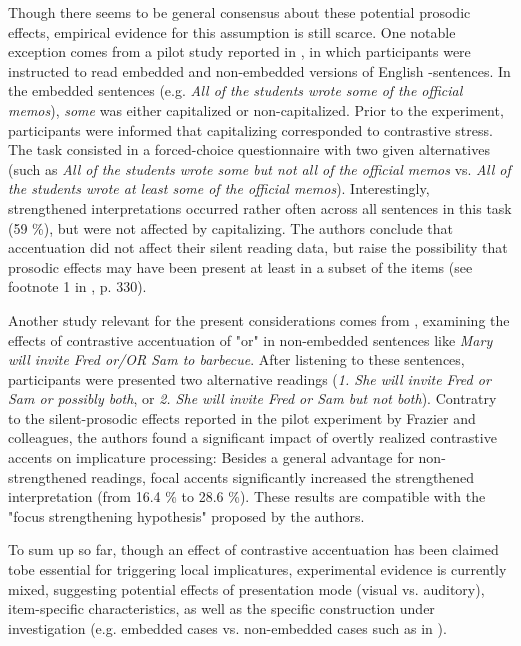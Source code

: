 \documentclass[fleqn,reqno,10pt,draft]{article}
\newcommand{\as}{\acro{as}}
\begin{document}
Though there seems to be general consensus about these potential 
prosodic effects, empirical evidence for this assumption 
is still scarce. One notable exception comes from a pilot study 
reported in \citet{Frazier08}, in which participants were 
instructed to read embedded and non-embedded versions of English 
\as-sentences. In the embedded sentences (e.g. {\it All of the students 
wrote some of the official memos}), {\it some} was either capitalized 
or non-capitalized. Prior to the experiment, 
participants were informed that capitalizing corresponded to contrastive 
stress. The task consisted in a forced-choice questionnaire with two
given alternatives (such as {\it All of the students wrote some but 
not all of the official memos}  vs. {\it All of the students wrote at 
least some of the official memos}). Interestingly, strengthened  
interpretations occurred rather often across all sentences in this task 
(59 \%), but were not affected by capitalizing.  The authors 
conclude that accentuation did not affect their silent reading data, 
but raise the possibility that prosodic effects may have been present 
at least in a subset of the items (see footnote 1 in \citet{Frazier08}, 
p. 330).

Another study relevant for the present considerations comes from 
\citet{SchwarzClifton2008:Strengthening-o}, examining the effects of 
contrastive accentuation of "or" in non-embedded sentences like {\it 
Mary will invite Fred or/OR Sam to barbecue}. After listening to these 
sentences, participants were presented two alternative readings 
({\it 1. She will invite Fred or Sam or possibly both}, or {\it 2. 
She will invite Fred or Sam but not both}). Contratry to the silent-prosodic 
effects reported in the pilot experiment by Frazier and colleagues, the 
authors found a significant impact of overtly realized contrastive accents 
on implicature processing: Besides a general advantage for non-strengthened 
readings, focal accents significantly increased the strengthened interpretation 
(from 16.4 \% to 28.6 \%). These results are compatible with the "focus 
strengthening hypothesis" proposed by the authors.

To sum up so far, though an effect of contrastive accentuation has been 
claimed tobe essential for triggering local implicatures, experimental evidence 
is currently mixed, suggesting potential effects of presentation mode (visual vs. 
auditory), item-specific characteristics, as well as the specific construction 
under investigation (e.g. embedded cases vs. non-embedded cases such as in 
\citet{SchwarzClifton2008:Strengthening-o}).
\end{document}
